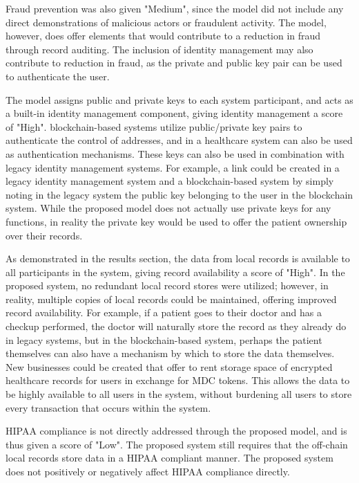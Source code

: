 \documentclass[12pt]{report}
\begin{document}
Fraud prevention was also given "Medium", since the model did not include any direct demonstrations of malicious actors or fraudulent activity. The model, however, does offer elements that would contribute to a reduction in fraud through record auditing. The inclusion of identity management may also contribute to reduction in fraud, as the private and public key pair can be used to authenticate the user.

The model assigns public and private keys to each system participant, and acts as a built-in identity management component, giving identity management a score of "High". blockchain-based systems utilize public/private key pairs to authenticate the control of addresses, and in a healthcare system can also be used as authentication mechanisms. These keys can also be used in combination with legacy identity management systems. For example, a link could be created in a legacy identity management system and a blockchain-based system by simply noting in the legacy system the public key belonging to the user in the blockchain system. While the proposed model does not actually use private keys for any functions, in reality the private key would be used to offer the patient ownership over their records.

As demonstrated in the results section, the data from local records is available to all participants in the system, giving record availability a score of "High". In the proposed system, no redundant local record stores were utilized; however, in reality, multiple copies of local records could be maintained, offering improved record availability. For example, if a patient goes to their doctor and has a checkup performed, the doctor will naturally store the record as they already do in legacy systems, but in the blockchain-based system, perhaps the patient themselves can also have a mechanism by which to store the data themselves. New businesses could be created that offer to rent storage space of encrypted healthcare records for users in exchange for MDC tokens. This allows the data to be highly available to all users in the system, without burdening all users to store every transaction that occurs within the system.

HIPAA compliance is not directly addressed through the proposed model, and is thus given a score of "Low". The proposed system still requires that the off-chain local records store data in a HIPAA compliant manner. The proposed system does not positively or negatively affect HIPAA compliance directly.
\end{document}
